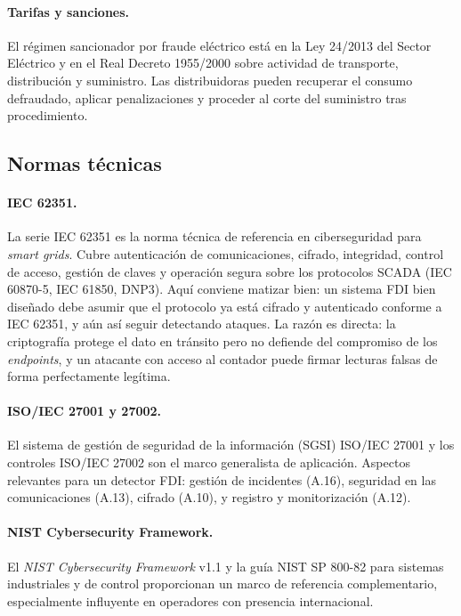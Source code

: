 \paragraph{Tarifas y sanciones.} El régimen sancionador por fraude eléctrico está en la Ley 24/2013 del Sector Eléctrico \cite{ley24_2013} y en el Real Decreto 1955/2000 sobre actividad de transporte, distribución y suministro. Las distribuidoras pueden recuperar el consumo defraudado, aplicar penalizaciones y proceder al corte del suministro tras procedimiento.

\subsection{Normas técnicas}

\paragraph{IEC 62351.} La serie IEC 62351 \cite{iec62351} es la norma técnica de referencia en ciberseguridad para \textit{smart grids}. Cubre autenticación de comunicaciones, cifrado, integridad, control de acceso, gestión de claves y operación segura sobre los protocolos SCADA (IEC 60870-5, IEC 61850, DNP3). Aquí conviene matizar bien: un sistema FDI bien diseñado debe asumir que el protocolo ya está cifrado y autenticado conforme a IEC 62351, y aún así seguir detectando ataques. La razón es directa: la criptografía protege el dato en tránsito pero no defiende del compromiso de los \textit{endpoints}, y un atacante con acceso al contador puede firmar lecturas falsas de forma perfectamente legítima.

\paragraph{ISO/IEC 27001 y 27002.} El sistema de gestión de seguridad de la información (SGSI) ISO/IEC 27001 \cite{iso27001} y los controles ISO/IEC 27002 son el marco generalista de aplicación. Aspectos relevantes para un detector FDI: gestión de incidentes (A.16), seguridad en las comunicaciones (A.13), cifrado (A.10), y registro y monitorización (A.12).

\paragraph{NIST Cybersecurity Framework.} El \emph{NIST Cybersecurity Framework} v1.1 \cite{nist_csf} y la guía NIST SP 800-82 \cite{nist80082} para sistemas industriales y de control proporcionan un marco de referencia complementario, especialmente influyente en operadores con presencia internacional.

